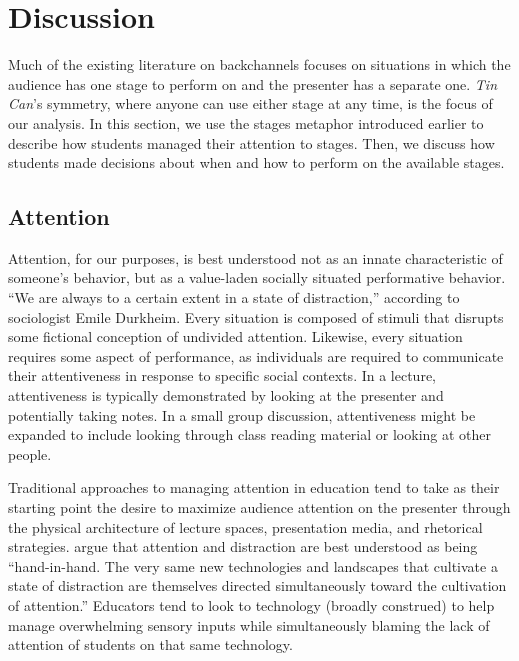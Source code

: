 


\section{Discussion}
Much of the existing literature on backchannels focuses on situations in which the audience has one stage to perform on and the presenter has a separate one.  \citep{Yardi:2006uk, mccarthy_digital_2004} \emph{Tin Can}'s symmetry, where anyone can use either stage at any time, is the focus of our analysis. In this section, we use the stages metaphor introduced earlier to describe how students managed their attention to stages. Then, we discuss how students made decisions about when and how to perform on the available stages. 

\subsection{Attention}
Attention, for our purposes, is best understood not as an innate characteristic of someone's behavior, but as a value-laden socially situated performative behavior. ``We are always to a certain extent in a state of distraction,'' according to sociologist Emile Durkheim. \citep{Durkheim:1974tc} Every situation is composed of stimuli that disrupts some fictional conception of undivided attention.  Likewise, every situation requires some aspect of performance, as individuals are required to communicate their attentiveness in response to specific social contexts. In a lecture, attentiveness is typically demonstrated by looking at the presenter and potentially taking notes. In a small group discussion, attentiveness might be expanded to include looking through class reading material or looking at other people. 

Traditional approaches to managing attention in education tend to take as their starting point the desire to maximize audience attention on the presenter through the physical architecture of lecture spaces, presentation media, and rhetorical strategies. \citet{Gordon:2009us} argue that attention and distraction are best understood as being ``hand-in-hand. The very same new technologies and landscapes that cultivate a state of distraction are themselves directed simultaneously toward the cultivation of attention.'' Educators tend to look to technology (broadly construed) to help manage overwhelming sensory inputs while simultaneously blaming the lack of attention of students on that same technology.

